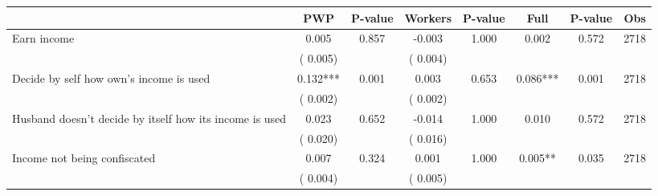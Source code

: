 
\begin{tabular}{l*{7}{c}}\hline&\multicolumn{1}{c}{PWP}&\multicolumn{1}{c}{P-value}&\multicolumn{1}{c}{Workers}&\multicolumn{1}{c}{P-value}&\multicolumn{1}{c}{Full}&\multicolumn{1}{c}{P-value}&\multicolumn{1}{c}{Obs} \\ \hline

 Earn income       &              0.005       &        0.857  &             -0.003       &        1.000  &              0.002       &              0.572 &  2718 \\ 
                       &       (       0.005)             &                               &       (       0.004)                     &                               &                                               &                                &                      \\ 

 Decide by self how own's income is used       &              0.132***       &        0.001  &              0.003       &        0.653  &              0.086***       &              0.001 &  2718 \\ 
                       &       (       0.002)             &                               &       (       0.002)                     &                               &                                               &                                &                      \\ 

 Husband doesn't decide by itself how its income is used       &              0.023       &        0.652  &             -0.014       &        1.000  &              0.010       &              0.572 &  2718 \\ 
                       &       (       0.020)             &                               &       (       0.016)                     &                               &                                               &                                &                      \\ 

 Income not being confiscated       &              0.007       &        0.324  &              0.001       &        1.000  &              0.005**       &              0.035 &  2718 \\ 
                       &       (       0.004)             &                               &       (       0.005)                     &                               &                                               &                                &                      \\ 


\end{tabular}
